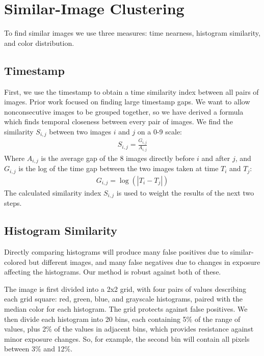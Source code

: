\documentclass{article}
\begin{document}

\section{Similar-Image Clustering}
To find similar images we use three measures: time nearness, histogram similarity, and color distribution.

\subsection{Timestamp}
First, we use the timestamp to obtain a time similarity index between all pairs of images. Prior work focused on finding large timestamp gaps\cite{1292402}. We want to allow nonconsecutive images to be grouped together, so we have derived a formula which finds temporal closeness between every pair of images. We find the similarity \(S_{i,j}\) between two images \(i\) and \(j\) on a 0-9 scale:
\begin{eqnarray}
S_{i,j}=\frac{G_{i,j}}{A_{i,j}}
\end{eqnarray}
Where \(A_{i,j}\) is the average gap of the 8 images directly before \(i\) and after \(j\), and  \(G_{i,j}\) is the log of the time gap between the two images taken at time \(T_i\) and \(T_j\):
\begin{eqnarray}
G_{i,j}=\log(|T_i-T_j|)
\end{eqnarray}
The calculated similarity index \(S_{i,j}\) is used to weight the results of the next two steps.


\subsection{Histogram Similarity}
Directly comparing histograms will produce many false positives due to similar-colored but different images, and many false negatives due to changes in exposure affecting the histograms. Our method is robust against both of these.

The image is first divided into a 2x2 grid, with four pairs of values describing each grid square: red, green, blue, and grayscale histograms, paired with the median color for each histogram. The grid protects against false positives. We then divide each histogram into 20 bins, each containing 5\% of the range of values, plus 2\% of the values in adjacent bins, which provides resistance against minor exposure changes. So, for example, the second bin will contain all pixels between 3\% and 12\%.
\end{document}
